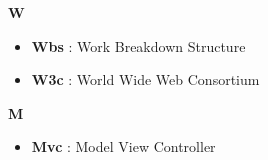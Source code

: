 {\huge \textbf{W}}
\begin{flushleft}
\begin{itemize}[label={}]
\item \textbf{Wbs} : Work Breakdown Structure
\item \textbf{W3c} : World Wide Web Consortium
\end{itemize}
\end{flushleft}
{\huge \textbf{M}}
\begin{flushleft}
\begin{itemize}[label={}]
\item \textbf{Mvc} : Model View Controller
\end{itemize}
\end{flushleft}
